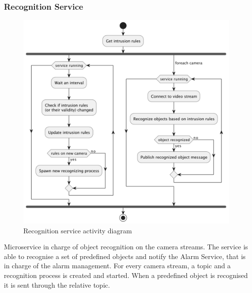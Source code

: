\documentclass{scrartcl}
\begin{document}
    \subsubsection{Recognition Service}
    \begin{figure}
        \centering
        \includegraphics[scale=0.6]{img/recognition-activity}
        \caption{Recognition service activity diagram}
        \label{fig:recognition-activity}
    \end{figure}
    Microservice in charge of object recognition on the camera streams.
    The service is able to recognise a set of predefined objects and notify the Alarm Service, that is in charge of the alarm management.
    For every camera stream, a topic and a recognition process is created and started.
    When a predefined object is recognised it is sent through the relative topic.
\end{document}
